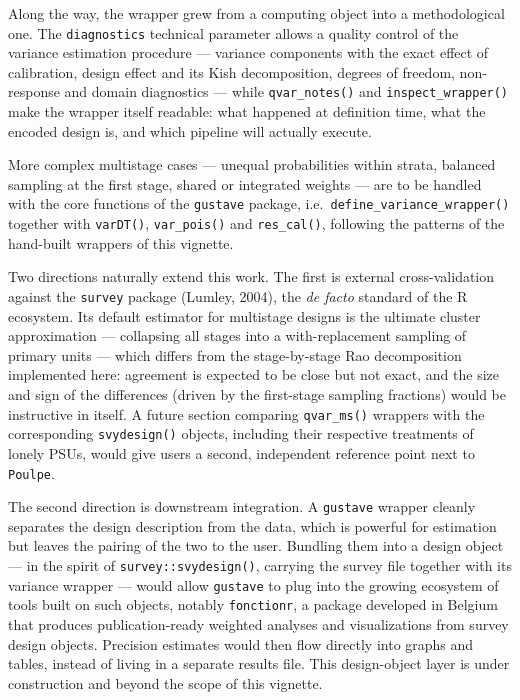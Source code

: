 \documentclass[
]{article}
\begin{document}
Along the way, the wrapper grew from a computing object into a
methodological one. The \texttt{diagnostics} technical parameter allows
a quality control of the variance estimation procedure --- variance
components with the exact effect of calibration, design effect and its
Kish decomposition, degrees of freedom, non-response and domain
diagnostics --- while \texttt{qvar\_notes()} and
\texttt{inspect\_wrapper()} make the wrapper itself readable: what
happened at definition time, what the encoded design is, and which
pipeline will actually execute.

More complex multistage cases --- unequal probabilities within strata,
balanced sampling at the first stage, shared or integrated weights ---
are to be handled with the core functions of the \texttt{gustave}
package, i.e.~\texttt{define\_variance\_wrapper()} together with
\texttt{varDT()}, \texttt{var\_pois()} and \texttt{res\_cal()},
following the patterns of the hand-built wrappers of this vignette.

Two directions naturally extend this work. The first is external
cross-validation against the \texttt{survey} package (Lumley, 2004), the
\emph{de facto} standard of the R ecosystem. Its default estimator for
multistage designs is the ultimate cluster approximation --- collapsing
all stages into a with-replacement sampling of primary units --- which
differs from the stage-by-stage Rao decomposition implemented here:
agreement is expected to be close but not exact, and the size and sign
of the differences (driven by the first-stage sampling fractions) would
be instructive in itself. A future section comparing \texttt{qvar\_ms()}
wrappers with the corresponding \texttt{svydesign()} objects, including
their respective treatments of lonely PSUs, would give users a second,
independent reference point next to \texttt{Poulpe}.

The second direction is downstream integration. A \texttt{gustave}
wrapper cleanly separates the design description from the data, which is
powerful for estimation but leaves the pairing of the two to the user.
Bundling them into a design object --- in the spirit of
\texttt{survey::svydesign()}, carrying the survey file together with its
variance wrapper --- would allow \texttt{gustave} to plug into the
growing ecosystem of tools built on such objects, notably
\texttt{fonctionr}, a package developed in Belgium that produces
publication-ready weighted analyses and visualizations from survey
design objects. Precision estimates would then flow directly into graphs
and tables, instead of living in a separate results file. This
design-object layer is under construction and beyond the scope of this
vignette.
\end{document}
